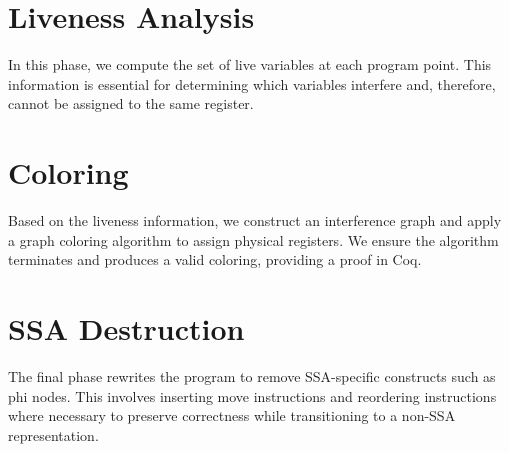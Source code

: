 \section{Liveness Analysis}

In this phase, we compute the set of live variables at each program point. This information is essential for determining which variables interfere and, therefore, cannot be assigned to the same register.

\section{Coloring}

Based on the liveness information, we construct an interference graph and apply a graph coloring algorithm to assign physical registers. We ensure the algorithm terminates and produces a valid coloring, providing a proof in Coq.

\section{SSA Destruction}

The final phase rewrites the program to remove SSA-specific constructs such as phi nodes. This involves inserting move instructions and reordering instructions where necessary to preserve correctness while transitioning to a non-SSA representation.